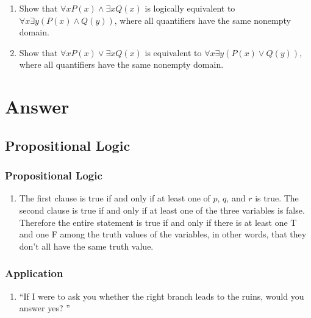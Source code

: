 \documentclass{sig-alternate-05-2015}
\begin{document}
\begin{enumerate}
\item Show that $\forall x P(x) \wedge \exists x Q(x)$ is logically equivalent
to $\forall x \exists y (P(x) \wedge Q(y))$, where all quantifiers have
the same nonempty domain.

\item Show that $\forall xP(x) \vee \exists x Q(x)$ is equivalent to $\forall x \exists y
(P(x) \vee Q(y))$, where all quantifiers have the same
nonempty domain.
\end{enumerate}

\newpage
\appendix
\section{Answer}
\subsection{Propositional Logic}
\subsubsection{Propositional Logic}
\begin{enumerate}

\item The first clause is true if and only if at least one of $p$, $q$, and
$r$ is true. The second clause is true if and only if at least one of
the three variables is false. Therefore the entire statement is
true if and only if there is at least one T and one F among the
truth values of the variables, in other words, that they don’t all
have the same truth value.
\end{enumerate}

\subsubsection{Application}

\begin{enumerate}
\item \textquotedblleft If I were to ask you whether the right branch
leads to the ruins, would you answer yes? \textquotedblright
\end{enumerate}
\end{document}
